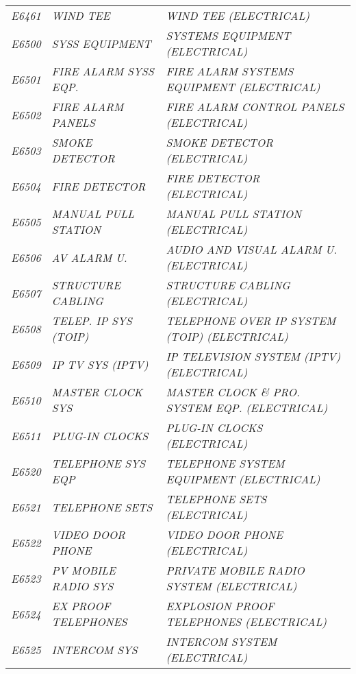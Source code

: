 \begin{landscape}
\begin{longtable}[l]{l%
                  l|%
                  l|}
\itshape E6461       &\itshape WIND TEE   &\itshape WIND TEE (ELECTRICAL)   \\
\itshape E6500       &\itshape SYSS EQUIPMENT   &\itshape SYSTEMS EQUIPMENT (ELECTRICAL)   \\
\itshape E6501       &\itshape FIRE ALARM SYSS EQP.   &\itshape FIRE ALARM SYSTEMS EQUIPMENT (ELECTRICAL)   \\
\itshape E6502       &\itshape FIRE ALARM PANELS   &\itshape FIRE ALARM CONTROL PANELS (ELECTRICAL)   \\
\itshape E6503       &\itshape SMOKE DETECTOR   &\itshape SMOKE DETECTOR (ELECTRICAL)   \\
\itshape E6504       &\itshape FIRE DETECTOR   &\itshape FIRE DETECTOR (ELECTRICAL)   \\
\itshape E6505       &\itshape MANUAL PULL STATION   &\itshape MANUAL PULL STATION (ELECTRICAL)   \\
\itshape E6506       &\itshape AV ALARM U.   &\itshape AUDIO AND VISUAL ALARM U. (ELECTRICAL)   \\
\itshape E6507       &\itshape STRUCTURE CABLING   &\itshape STRUCTURE CABLING (ELECTRICAL)   \\
\itshape E6508       &\itshape TELEP. IP SYS (TOIP)   &\itshape TELEPHONE OVER IP SYSTEM (TOIP) (ELECTRICAL)   \\
\itshape E6509       &\itshape IP TV SYS (IPTV)   &\itshape IP TELEVISION SYSTEM (IPTV) (ELECTRICAL)   \\
\itshape E6510       &\itshape MASTER CLOCK SYS   &\itshape MASTER CLOCK \& PRO. SYSTEM EQP. (ELECTRICAL)   \\
\itshape E6511       &\itshape PLUG-IN CLOCKS   &\itshape PLUG-IN CLOCKS (ELECTRICAL)   \\
\itshape E6520       &\itshape TELEPHONE SYS EQP   &\itshape TELEPHONE SYSTEM EQUIPMENT (ELECTRICAL)   \\
\itshape E6521       &\itshape TELEPHONE SETS   &\itshape TELEPHONE SETS (ELECTRICAL)   \\
\itshape E6522       &\itshape VIDEO DOOR PHONE   &\itshape VIDEO DOOR PHONE (ELECTRICAL)   \\
\itshape E6523       &\itshape PV MOBILE RADIO SYS   &\itshape PRIVATE MOBILE RADIO SYSTEM (ELECTRICAL)   \\
\itshape E6524       &\itshape EX PROOF TELEPHONES   &\itshape EXPLOSION PROOF TELEPHONES (ELECTRICAL)   \\
\itshape E6525       &\itshape INTERCOM SYS   &\itshape INTERCOM SYSTEM (ELECTRICAL)   \\

\end{longtable}
\end{landscape}
